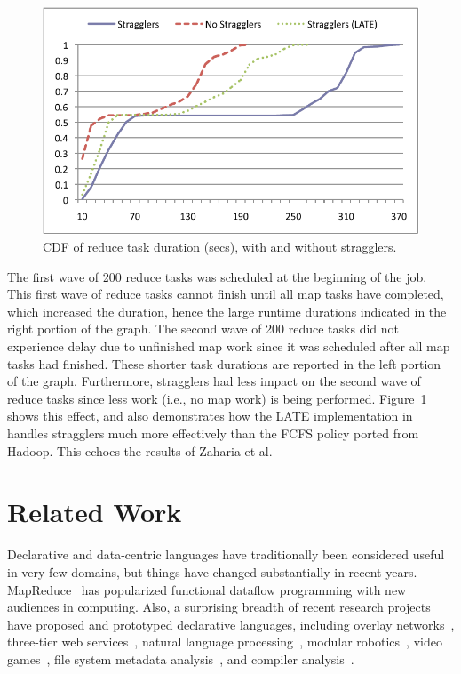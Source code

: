 \begin{figure}
\ssp
  \centering
  \includegraphics[scale=0.75]{figures/reduce_stragglers}
  \caption{CDF of reduce task duration (secs), with and without stragglers.}
  \label{fig:ec2reduce}
\end{figure}

The first wave of 200 reduce tasks was scheduled at the beginning of the
job. This first wave of reduce tasks cannot finish until all map tasks have
completed, which increased the duration, hence the large runtime durations indicated in the right
portion of the graph. The second wave of 200 reduce tasks did not experience
delay due to unfinished map work since it was scheduled after all map tasks had
finished. These shorter task durations are reported in the left portion of the
graph. Furthermore, stragglers had less impact on the second wave of reduce
tasks since less work (i.e., no map work) is being performed. Figure~\ref{fig:ec2reduce} 
shows this effect, and also demonstrates how the LATE implementation in {\BOOMA} 
handles stragglers much more effectively than the FCFS policy ported from Hadoop.  
This echoes the results of Zaharia et al.~\cite{zaharia-late}

\section{Related Work}
\label{ch:boom:sec:relwork}

Declarative and data-centric languages have traditionally been considered useful
in very few domains, but things have changed substantially in recent years.
MapReduce~\cite{mapreduce-osdi} has popularized functional dataflow programming
with new audiences in computing.  Also, a surprising breadth of recent research
projects have proposed and prototyped declarative languages, including overlay
networks~\cite{p2:sosp}, three-tier web services~\cite{hilda}, natural language
processing~\cite{dyna}, modular robotics~\cite{meld}, video games~\cite{cornellgames}, 
file system metadata analysis~\cite{wiscfsck}, and compiler analysis~\cite{bddbddb}.

